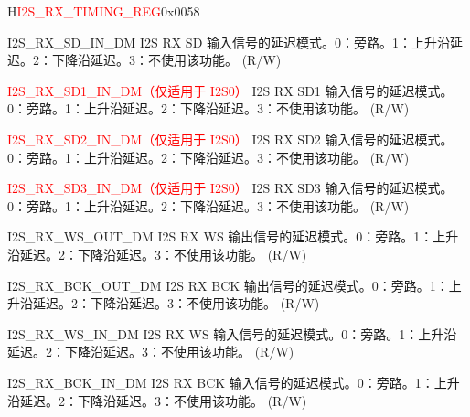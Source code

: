 \begin{register}{H}{\textcolor{red}{I2S\_RX\_TIMING\_REG}}{0x{}0058}\label{regdesc:I2SRXTIMINGREG}
%
%
%
%
%
%
%
%
%
%
%
%
%
%
%
%
\regnewline%
\begin{regdesc}\begin{reglist}
\label{fielddesc:I2SRXSDINDM}\item [I2S\_RX\_SD\_IN\_DM] I2S RX SD 输入信号的延迟模式。0：旁路。1：上升沿延迟。2：下降沿延迟。3：不使用该功能。 (R/W)
\label{fielddesc:I2SRXSD1INDM}\item [\textcolor{red}{I2S\_RX\_SD1\_IN\_DM（仅适用于 I2S0）}] I2S RX SD1 输入信号的延迟模式。0：旁路。1：上升沿延迟。2：下降沿延迟。3：不使用该功能。 (R/W)
\label{fielddesc:I2SRXSD2INDM}\item [\textcolor{red}{I2S\_RX\_SD2\_IN\_DM（仅适用于 I2S0）}] I2S RX SD2 输入信号的延迟模式。0：旁路。1：上升沿延迟。2：下降沿延迟。3：不使用该功能。 (R/W)
\label{fielddesc:I2SRXSD3INDM}\item [\textcolor{red}{I2S\_RX\_SD3\_IN\_DM（仅适用于 I2S0）}] I2S RX SD3 输入信号的延迟模式。0：旁路。1：上升沿延迟。2：下降沿延迟。3：不使用该功能。 (R/W)
\label{fielddesc:I2SRXWSOUTDM}\item [I2S\_RX\_WS\_OUT\_DM] I2S RX WS 输出信号的延迟模式。0：旁路。1：上升沿延迟。2：下降沿延迟。3：不使用该功能。 (R/W)
\label{fielddesc:I2SRXBCKOUTDM}\item [I2S\_RX\_BCK\_OUT\_DM] I2S RX BCK 输出信号的延迟模式。0：旁路。1：上升沿延迟。2：下降沿延迟。3：不使用该功能。 (R/W)
\label{fielddesc:I2SRXWSINDM}\item [I2S\_RX\_WS\_IN\_DM] I2S RX WS 输入信号的延迟模式。0：旁路。1：上升沿延迟。2：下降沿延迟。3：不使用该功能。 (R/W)
\label{fielddesc:I2SRXBCKINDM}\item [I2S\_RX\_BCK\_IN\_DM] I2S RX BCK 输入信号的延迟模式。0：旁路。1：上升沿延迟。2：下降沿延迟。3：不使用该功能。 (R/W)
\end{reglist}\end{regdesc}
\end{register}


